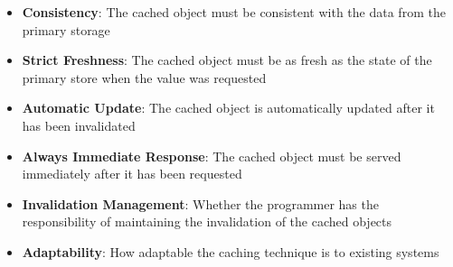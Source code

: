 \begin{itemize}
  \item \textbf{Consistency}: The cached object must be consistent with the data from the primary storage
  \item \textbf{Strict Freshness}: The cached object must be as fresh as the state of the primary store when the value was requested
  \item \textbf{Automatic Update}: The cached object is automatically updated after it has been invalidated
  \item \textbf{Always Immediate Response}: The cached object must be served immediately after it has been requested
  \item \textbf{Invalidation Management}: Whether the programmer has the responsibility of maintaining the invalidation of the cached objects
  \item \textbf{Adaptability}: How adaptable the caching technique is to existing systems
\end{itemize}


